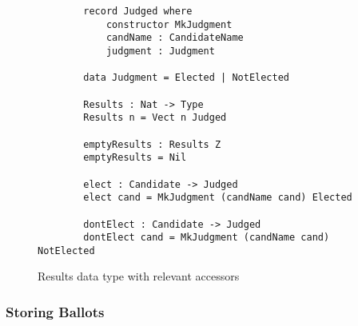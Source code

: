 \begin{figure}[htbp!!!!!!!!!!!!!!]
	\caption{Results data type with relevant accessors}
	\label{judgments_code}
    \begin{lstlisting}
        record Judged where
            constructor MkJudgment
            candName : CandidateName
            judgment : Judgment

        data Judgment = Elected | NotElected

        Results : Nat -> Type
        Results n = Vect n Judged
        
        emptyResults : Results Z
        emptyResults = Nil

        elect : Candidate -> Judged
        elect cand = MkJudgment (candName cand) Elected

        dontElect : Candidate -> Judged
        dontElect cand = MkJudgment (candName cand) NotElected
    \end{lstlisting}
\end{figure}

\subsubsection{Storing Ballots}


